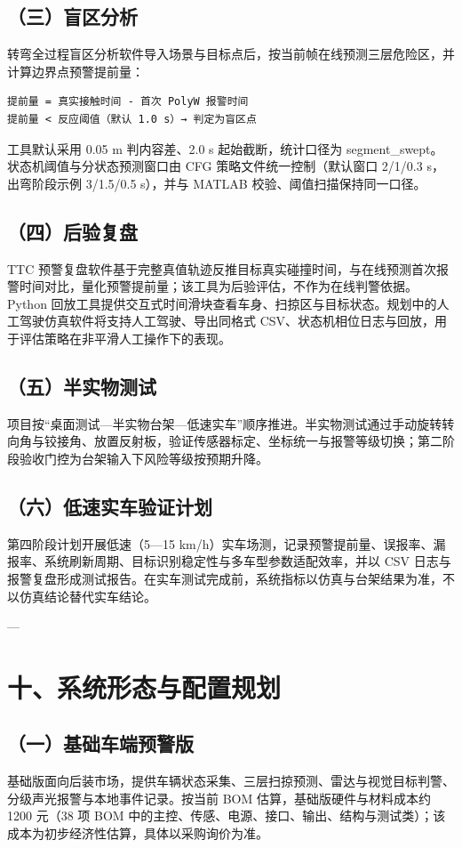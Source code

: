 \documentclass[UTF8,11pt]{ctexart}
\begin{document}
\subsection*{（三）盲区分析}
转弯全过程盲区分析软件导入场景与目标点后，按当前帧在线预测三层危险区，并计算边界点预警提前量：

\begin{verbatim}
提前量 = 真实接触时间 - 首次 PolyW 报警时间
提前量 < 反应阈值（默认 1.0 s）→ 判定为盲区点
\end{verbatim}
工具默认采用 0.05 m 判内容差、2.0 s 起始截断，统计口径为 segment\_swept。状态机阈值与分状态预测窗口由 CFG 策略文件统一控制（默认窗口 2/1/0.3 s，出弯阶段示例 3/1.5/0.5 s），并与 MATLAB 校验、阈值扫描保持同一口径。

\subsection*{（四）后验复盘}
TTC 预警复盘软件基于完整真值轨迹反推目标真实碰撞时间，与在线预测首次报警时间对比，量化预警提前量；该工具为后验评估，不作为在线判警依据。Python 回放工具提供交互式时间滑块查看车身、扫掠区与目标状态。规划中的人工驾驶仿真软件将支持人工驾驶、导出同格式 CSV、状态机相位日志与回放，用于评估策略在非平滑人工操作下的表现。

\subsection*{（五）半实物测试}
项目按“桌面测试—半实物台架—低速实车”顺序推进。半实物测试通过手动旋转转向角与铰接角、放置反射板，验证传感器标定、坐标统一与报警等级切换；第二阶段验收门控为台架输入下风险等级按预期升降。

\subsection*{（六）低速实车验证计划}
第四阶段计划开展低速（5—15 km/h）实车场测，记录预警提前量、误报率、漏报率、系统刷新周期、目标识别稳定性与多车型参数适配效率，并以 CSV 日志与报警复盘形成测试报告。在实车测试完成前，系统指标以仿真与台架结果为准，不以仿真结论替代实车结论。

---

\section*{十、系统形态与配置规划}
\subsection*{（一）基础车端预警版}
基础版面向后装市场，提供车辆状态采集、三层扫掠预测、雷达与视觉目标判警、分级声光报警与本地事件记录。按当前 BOM 估算，基础版硬件与材料成本约 1200 元（38 项 BOM 中的主控、传感、电源、接口、输出、结构与测试类）；该成本为初步经济性估算，具体以采购询价为准。
\end{document}
